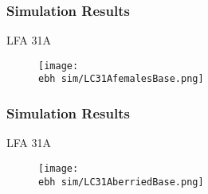 \documentclass{beamer}
\newcommand{\ebh}{\string~/bio.data/bio.lobster/figures/LFA2733Framework2018/} %
\begin{document}



\begin{frame}
\frametitle{Simulation Results}
LFA 31A 
\begin{figure}
        \begin{center}
            \texttt{[image: \\ebh sim/LC31AfemalesBase.png]}
        \end{center}
    \end{figure}
\end{frame}




\begin{frame}
\frametitle{Simulation Results}
LFA 31A 
\begin{figure}
        \begin{center}
            \texttt{[image: \\ebh sim/LC31AberriedBase.png]}
        \end{center}
    \end{figure}
\end{frame}


\end{document}
